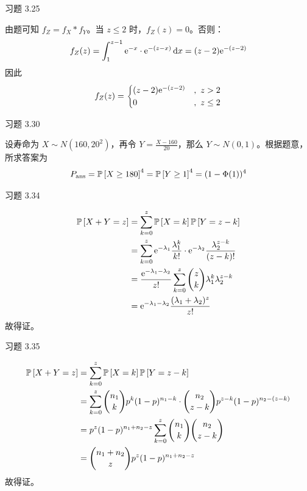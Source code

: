 \begin{problem}
    习题 3.25
    \begin{solution}
        由题可知 $f_Z = f_X * f_Y$。当 $z \le 2$ 时，$f_Z(z) = 0$。否则：
        $$
        f_Z(z) = \int_{1}^{z - 1} \mathrm{e}^{-x} \cdot \mathrm{e}^{-(z - x)} \dd{x} = (z - 2) \mathrm{e}^{-(z - 2)}
        $$
        因此
        $$
        f_Z(z) = \begin{cases}
            (z - 2) \mathrm{e}^{-(z - 2)} &,\ z > 2 \\
            0 &,\ z \le 2
        \end{cases}
        $$
    \end{solution}
\end{problem}

\begin{problem}
    习题 3.30
    \begin{solution}
        设寿命为 $X \sim N(160, 20^2)$，再令 $Y = \frac{X - 160}{20}$，那么 $Y \sim N(0, 1)$。根据题意，所求答案为
        $$
        P_{\mathrm{ans}} = \operatorname{\mathbb{P}}\left[X \ge 180\right]^{4} = \operatorname{\mathbb{P}}\left[Y \ge 1\right]^{4} = (1 - \Phi(1))^{4}
        $$
    \end{solution}
\end{problem}

\begin{problem}
    习题 3.34
    \begin{solution}
        $$
        \begin{aligned}
            \operatorname{\mathbb{P}}\left[X + Y = z\right] & = \sum_{k = 0}^{z} \operatorname{\mathbb{P}}\left[X = k\right] \operatorname{\mathbb{P}}\left[Y = z - k\right] \\
            & = \sum_{k = 0}^{z} \mathrm{e}^{-\lambda_1} \frac{\lambda_1^k}{k!} \cdot \mathrm{e}^{-\lambda_2} \frac{\lambda_2^{z - k}}{(z - k)!} \\
            & = \frac{\mathrm{e}^{-\lambda_1 - \lambda_2}}{z!} \sum_{k = 0}^{z} \binom{z}{k} \lambda_1^k \lambda_2^{z - k} \\
            & = \mathrm{e}^{-\lambda_1 - \lambda_2} \frac{(\lambda_1 + \lambda_2)^{z}}{z!}
        \end{aligned}
        $$
        故得证。
    \end{solution}
\end{problem}

\begin{problem}
    习题 3.35
    \begin{solution}
        $$
        \begin{aligned}
            \operatorname{\mathbb{P}}\left[X + Y = z\right] & = \sum_{k = 0}^{z} \operatorname{\mathbb{P}}\left[X = k\right] \operatorname{\mathbb{P}}\left[Y = z - k\right] \\
            & = \sum_{k = 0}^{z} \binom{n_1}{k} p^{k} (1 - p)^{n_1 - k} \cdot \binom{n_2}{z - k} p^{z - k} (1 - p)^{n_2 - (z - k)} \\
            & = p^{z} (1 - p)^{n_1 + n_2 - z} \sum_{k = 0}^{z} \binom{n_1}{k} \binom{n_2}{z - k} \\
            & = \binom{n_1 + n_2}{z} p^{z} (1 - p)^{n_1 + n_2 - z}
        \end{aligned}
        $$
        故得证。
    \end{solution}
\end{problem}